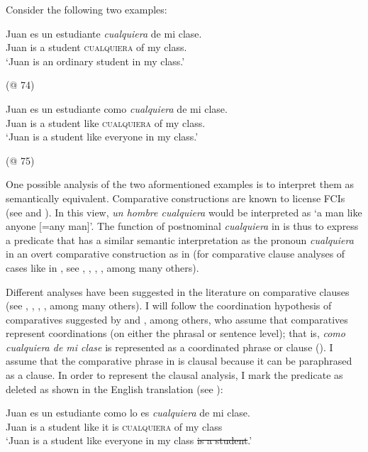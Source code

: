 {  Consider the following two examples:

\ea \label{bkm:Ref72353992} %
\gll Juan es un estudiante \textit{cualquiera} de mi clase.\\
Juan is a student \textsc{cualquiera} of my class.\\
\glt ‘Juan is an ordinary student in my class.’

  (@ 74)
\z


\ea \label{bkm:Ref72354006}  %
\gll Juan es un estudiante como \textit{cualquiera} de mi clase.\\
Juan is a student like \textsc{cualquiera} of my class.\\
\glt ‘Juan is a student like everyone in my class.’

  (@ 75)
\z

One possible analysis of the two aformentioned examples is to interpret them as semantically equivalent. Comparative constructions are known to license FCIs (see \citealt{Aloni2021} and ). In this view, \textit{un hombre cualquiera} would be interpreted as ‘a man like anyone [=any man]’. The function of postnominal \textit{cualquiera} in  is thus to express a predicate that has a similar semantic interpretation as the pronoun \textit{cualquiera} in an overt comparative construction as in   (for comparative clause analyses of cases like in , see \citealt{Bresnan1973}, \citealt{Napoli1986}, \citealt{Saez1992}, \citealt{Kennedy1999}, among many others).

Different analyses have been suggested in the literature on comparative clauses (see \citealt{Bresnan1973}, \citealt{Napoli1986}, \citealt{Saez1992}, \citealt{Kennedy1999}, among many others). I will follow the coordination hypothesis of comparatives suggested by \citet{Napoli1986} and \citet{Saez1992}, among others, who assume that comparatives represent coordinations (on either the phrasal or sentence level); that is, \textit{como cualquiera de mi clase} is represented as a coordinated phrase or clause (\cite{cp2009}). I assume that the comparative phrase in  is clausal because it can be paraphrased as a clause. In order to represent the clausal analysis, I mark the predicate as deleted as shown in the English translation (see \citealt{Bresnan1973}):

\ea \label{bkm:Ref72354047}  %

\gll Juan es un estudiante como lo es \textit{cualquiera} de mi clase.\\
  Juan is a student like it is \textsc{cualquiera} of my class\\
\glt ‘Juan is a student like everyone in my class \sout{is a student}.’

}
